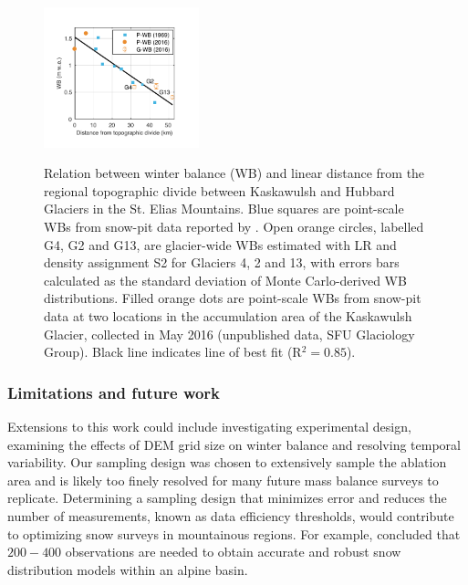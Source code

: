 \documentclass[twocolumn, letterpaper]{igs}
\begin{document}
\begin{figure}
	\centering
	\includegraphics[width =0.4\textwidth]{AccumGrad.pdf}\\
	\caption{Relation between winter balance (WB) and linear distance from the regional topographic divide between Kaskawulsh and Hubbard Glaciers in the St. Elias Mountains. Blue squares are point-scale WBs from snow-pit data reported by \cite{Taylor1969}. Open orange circles, labelled G4, G2 and G13, are glacier-wide WBs estimated with LR and density assignment S2 for Glaciers 4, 2 and 13, with errors bars calculated as the standard deviation of Monte Carlo-derived WB distributions. Filled orange dots are point-scale WBs from snow-pit data at two locations in the accumulation area of the Kaskawulsh Glacier, collected in May 2016 (unpublished data, SFU Glaciology Group). Black line indicates line of best fit (R$^2=0.85$).}
	\label{fig:AccumGrad}
\end{figure}


\subsubsection{Limitations and future work}

Extensions to this work could include investigating experimental design, examining the effects of DEM grid size on winter balance and resolving temporal variability. Our sampling design was chosen to extensively sample the ablation area and is likely too finely resolved for many future mass balance surveys to replicate. Determining a sampling design that minimizes error and reduces the number of measurements, known as data efficiency thresholds, would contribute to optimizing snow surveys in mountainous regions. For example, \cite{Lopez2010} concluded that $200-400$ observations are needed to obtain accurate and robust snow distribution models within an alpine basin. 
\end{document}
